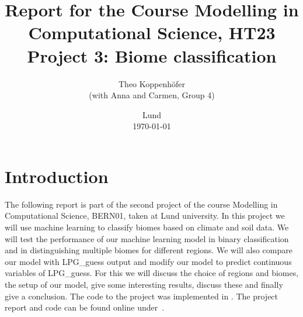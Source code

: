 





\title{ Report for the Course Modelling in Computational Science, HT23 \\[1ex]
	  \large Project 3: Biome classification}
\author{Theo Koppenhöfer \\[1ex] (with Anna and Carmen, Group 4)}
\date{Lund \\[1ex] \today}



\graphicspath{{../Project3RandomForestML/plots/}}




\usepackage{pythonhighlight}



\maketitle

\section{Introduction}
The following report is part of the second project of the course Modelling in Computational Science, BERN01, taken at Lund university.
In this project we will use machine learning to classify biomes based on climate and soil data. We will test the performance of our machine
learning model in binary classification and in distinguishing multiple biomes for different regions. We will also compare our model with LPG\_guess output
and modify our model to predict continuous variables of LPG\_guess.
For this we will discuss the choice of regions and biomes, the setup of our model, give some interesting results, discuss these and finally give a conclusion.
The code to the project was implemented in .
The project report and code can be found online under~\cite{Repository}.


